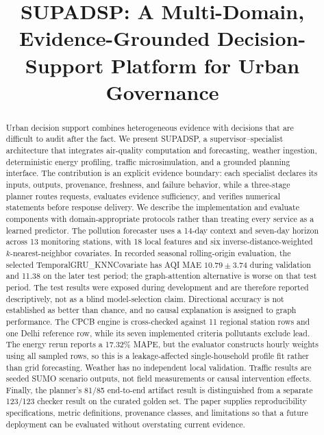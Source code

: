 \documentclass[conference]{IEEEtran}
\title{SUPADSP: A Multi-Domain, Evidence-Grounded Decision-Support Platform for Urban Governance}
\author{\IEEEauthorblockN{Anonymous Author(s)}\IEEEauthorblockA{Anonymous affiliation for review}}
\begin{document}
\maketitle

\begin{abstract}
Urban decision support combines heterogeneous evidence with decisions that are difficult to audit after the fact. We present SUPADSP, a supervisor--specialist architecture that integrates air-quality computation and forecasting, weather ingestion, deterministic energy profiling, traffic microsimulation, and a grounded planning interface. The contribution is an explicit evidence boundary: each specialist declares its inputs, outputs, provenance, freshness, and failure behavior, while a three-stage planner routes requests, evaluates evidence sufficiency, and verifies numerical statements before response delivery. We describe the implementation and evaluate components with domain-appropriate protocols rather than treating every service as a learned predictor. The pollution forecaster uses a 14-day context and seven-day horizon across 13 monitoring stations, with 18 local features and six inverse-distance-weighted $k$-nearest-neighbor covariates. In recorded seasonal rolling-origin evaluation, the selected TemporalGRU\_KNNCovariate has AQI MAE $10.79\pm3.74$ during validation and 11.38 on the later test period; the graph-attention alternative is worse on that test period. The test results were exposed during development and are therefore reported descriptively, not as a blind model-selection claim. Directional accuracy is not established as better than chance, and no causal explanation is assigned to graph performance. The CPCB engine is cross-checked against 11 regional station rows and one Delhi reference row, while its seven implemented criteria pollutants exclude lead. The energy rerun reports a 17.32\% MAPE, but the evaluator constructs hourly weights using all sampled rows, so this is a leakage-affected single-household profile fit rather than grid forecasting. Weather has no independent local validation. Traffic results are seeded SUMO scenario outputs, not field measurements or causal intervention effects. Finally, the planner's 81/85 end-to-end artifact result is distinguished from a separate 123/123 checker result on the curated golden set. The paper supplies reproducibility specifications, metric definitions, provenance classes, and limitations so that a future deployment can be evaluated without overstating current evidence.
\end{abstract}
\end{document}
